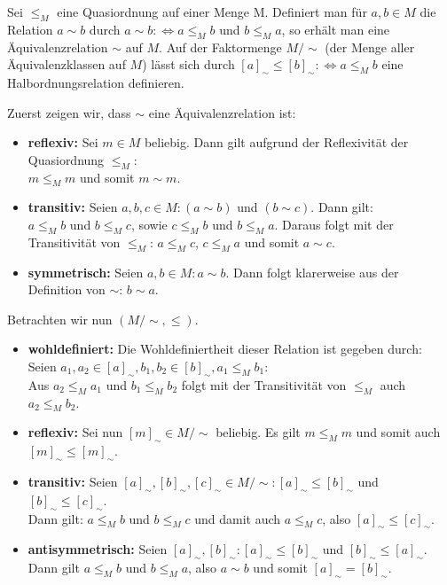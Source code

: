 \begin{exercise}
    Sei $\leq_M$ eine Quasiordnung auf einer Menge M. Definiert man für $a,b \in M$
    die Relation $a \sim b$ durch $a \sim b :\iff a \leq_M b$ und $ b \leq_M a$, so
    erhält man eine Äquivalenzrelation $\sim$ auf $M$. Auf der Faktormenge $M/\sim$
    (der Menge aller Äquivalenzklassen auf $M$) lässt sich durch $[a]_{\sim} \leq
    [b]_{\sim}: \iff a \leq_M b$ eine Halbordnungsrelation definieren.
\end{exercise}
\begin{solution}
Zuerst zeigen wir, dass $\sim$ eine Äquivalenzrelation ist: \\
\begin{itemize}
  \item \textbf{reflexiv:} Sei $m \in M$ beliebig. Dann gilt aufgrund der Reflexivität der Quasiordnung $\leq_M$: \\
  $m \leq_M m$ und somit $m \sim m$.
  \item \textbf{transitiv:} Seien $a,b,c \in M: (a \sim b)$ und $(b \sim c)$. Dann gilt: \\
  $a \leq_M b$ und $b \leq_M c$, sowie $c \leq_M b$ und $b \leq_M a$.
  Daraus folgt mit der Transitivität von $\leq_M$: $a \leq_M c$, $c \leq_M a$ und somit $a \sim c$.
  \item \textbf{symmetrisch:} Seien $a,b \in M: a \sim b$. Dann folgt klarerweise aus der Definition von $\sim$: $b \sim a$. \\
\end{itemize}
Betrachten wir nun $(M/\sim, \leq)$.
\begin{itemize}
  \item \textbf{wohldefiniert:} Die Wohldefiniertheit dieser Relation ist gegeben durch: \\
  Seien $a_1, a_2 \in [a]_{\sim}, b_1, b_2 \in [b]_{\sim}, a_1 \leq_M b_1$: \\
  Aus $a_2 \leq_M a_1$ und $b_1 \leq_M b_2$ folgt mit der Transitivität von $\leq_M$ auch $a_2 \leq_M b_2$. \\
  \item \textbf{reflexiv:} Sei nun $[m]_{\sim} \in M/\sim$ beliebig. Es gilt $m \leq_M m$ und somit auch $[m]_{\sim} \leq [m]_{\sim}$.
  \item \textbf{transitiv:} Seien $[a]_{\sim},[b]_{\sim},[c]_{\sim} \in M/\sim: [a]_{\sim} \leq [b]_{\sim}$ und
  $[b]_{\sim} \leq [c]_{\sim}$. \\
  Dann gilt: $a \leq_M b$ und $b \leq_M c$ und damit auch $a \leq_M c$, also $[a]_{\sim} \leq [c]_{\sim}$.
  \item \textbf{antisymmetrisch:} Seien $[a]_{\sim},[b]_{\sim}: [a]_{\sim} \leq [b]_{\sim}$ und $ [b]_{\sim} \leq [a]_{\sim}$. \\
  Dann gilt $a \leq_M b$ und $b \leq_M a$, also $a \sim b$ und somit $[a]_{\sim} = [b]_{\sim}$.
\end{itemize}
\end{solution}
